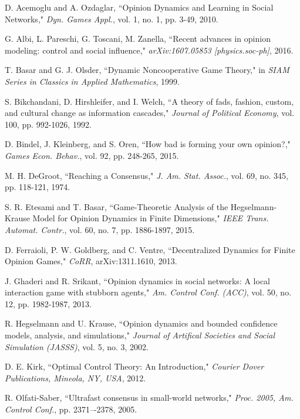 \documentclass[10pt, conference, compsocconf]{IEEEtran}
\begin{document}
\begin{thebibliography}{1}

D. Acemoglu and A. Ozdaglar, ``Opinion Dynamics and Learning in Social Networks," {\em Dyn. Games Appl.}, vol. 1, no. 1, pp. 3-49, 2010.

G. Albi, L. Pareschi, G. Toscani, M. Zanella, ``Recent advances in opinion modeling: control and social influence," {\em arXiv:1607.05853 [physics.soc-ph]}, 2016.

T. Basar and G. J. Olsder, ``Dynamic Noncooperative Game Theory," in {\em SIAM Series in Classics in Applied Mathematics}, 1999.

S. Bikchandani, D. Hirshleifer, and I. Welch, ``A theory of fads, fashion,
custom, and cultural change as information cascades," {\em Journal of Political
Economy}, vol. 100, pp. 992-1026, 1992.

D. Bindel, J. Kleinberg, and S. Oren, ``How bad is forming your own opinion?," {\em Games Econ. Behav.}, vol. 92, pp. 248-265, 2015.

M. H. DeGroot, ``Reaching a Consensus," {\em J. Am. Stat. Assoc.}, vol. 69, no. 345, pp. 118-121, 1974.

S. R. Etesami and T. Basar, ``Game-Theoretic Analysis of the Hegselmann-Krause Model for Opinion Dynamics in Finite Dimensions," {\em IEEE Trans. Automat. Contr.}, vol. 60, no. 7, pp. 1886-1897, 2015.

D. Ferraioli, P. W. Goldberg, and C. Ventre, ``Decentralized Dynamics for Finite Opinion Games," {\em CoRR}, arXiv:1311.1610, 2013.

J. Ghaderi and R. Srikant, ``Opinion dynamics in social networks: A local interaction game with stubborn agents," {\em Am. Control Conf. (ACC)}, vol. 50, no. 12, pp. 1982-1987, 2013.

R. Hegselmann and U. Krause, ``Opinion dynamics and bounded confidence
models, analysis, and simulations," {\em Journal of Artifical Societies and Social Simulation (JASSS)}, vol. 5, no. 3, 2002.

D. E. Kirk, ``Optimal Control Theory: An Introduction," {\em Courier Dover Publications, Mineola, NY, USA}, 2012.

R. Olfati-Saber, ``Ultrafast consensus in small-world networks," {\em Proc. 2005, Am. Control Conf.}, pp. 2371–-2378, 2005.


\end{thebibliography}
\end{document}
